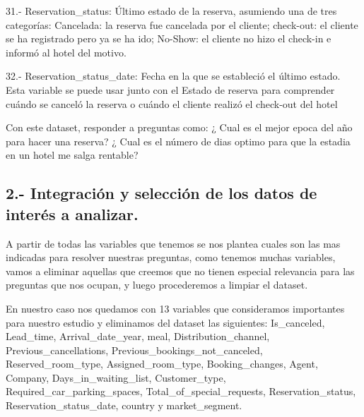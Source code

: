 \documentclass[]{article}
\begin{document}
31.- Reservation\_status: Último estado de la reserva, asumiendo una de
tres categorías: Cancelada: la reserva fue cancelada por el cliente;
check-out: el cliente se ha registrado pero ya se ha ido; No-Show: el
cliente no hizo el check-in e informó al hotel del motivo.

32.- Reservation\_status\_date: Fecha en la que se estableció el último
estado. Esta variable se puede usar junto con el Estado de reserva para
comprender cuándo se canceló la reserva o cuándo el cliente realizó el
check-out del hotel

Con este dataset, responder a preguntas como: ¿ Cual es el mejor epoca
del año para hacer una reserva? ¿ Cual es el número de dias optimo para
que la estadia en un hotel me salga rentable?

\hypertarget{integraciuxf3n-y-selecciuxf3n-de-los-datos-de-interuxe9s-a-analizar.}{%
\subsection{2.- Integración y selección de los datos de interés a
analizar.}\label{integraciuxf3n-y-selecciuxf3n-de-los-datos-de-interuxe9s-a-analizar.}}

A partir de todas las variables que tenemos se nos plantea cuales son
las mas indicadas para resolver nuestras preguntas, como tenemos muchas
variables, vamos a eliminar aquellas que creemos que no tienen especial
relevancia para las preguntas que nos ocupan, y luego procederemos a
limpiar el dataset.

En nuestro caso nos quedamos con 13 variables que consideramos
importantes para nuestro estudio y eliminamos del dataset las
siguientes: Is\_canceled, Lead\_time, Arrival\_date\_year, meal,
Distribution\_channel, Previous\_cancellations,
Previous\_bookings\_not\_canceled, Reserved\_room\_type,
Assigned\_room\_type, Booking\_changes, Agent, Company,
Days\_in\_waiting\_list, Customer\_type, Required\_car\_parking\_spaces,
Total\_of\_special\_requests, Reservation\_status,
Reservation\_status\_date, country y market\_segment.
\end{document}
